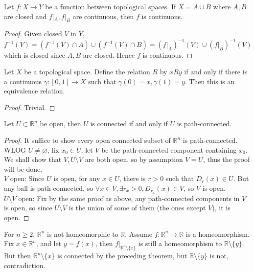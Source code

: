 \begin{lemma}
    Let $f:X\to Y$ be a function between topological spaces.
    If $X=A\cup B$ where $A,B$ are closed and $f|_A,f|_B$ are continuous, then $f$ is continuous.
\end{lemma}
\begin{proof}
    Given closed $V$ in $Y$,
    $$f^{-1}(V)=(f^{-1}(V)\cap A)\cup (f^{-1}(V)\cap B)=(f|_A)^{-1}(V)\cup (f|_B)^{-1}(V)$$
    which is closed since $A,B$ are closed.
    Hence $f$ is continuous.
\end{proof}
\begin{corollary}
    Let $X$ be a topological space.
    Define the relation $R$ by $xRy$ if and only if there is a continuous $\gamma:[0,1]\to X$ such that $\gamma(0)=x,\gamma(1)=y$.
    Then this is an equivalence relation.
\end{corollary}
\begin{proof}
    Trivial.
\end{proof}
\begin{theorem}
    Let $U\subset\mathbb R^n$ be open, then $U$ is connected if and only if $U$ is path-connected.
\end{theorem}
\begin{proof}
    It suffice to show every open connected subset of $\mathbb R^n$ is path-connected.\\
    WLOG $U\neq\varnothing$, fix $x_0\in U$, let $V$ be the path-connected component containing $x_0$.
    We shall show that $V,U\setminus V$ are both open, so by assumption $V=U$, thus the proof will be done.\\
    $V$ open: Since $U$ is open, for any $x\in U$, there is $r>0$ such that $D_r(x)\in U$.
    But any ball is path connected, so $\forall x\in V,\exists r_x>0, D_{r_x}(x)\in V$, so $V$ is open.\\
    $U\setminus V$ open: Fix by the same proof as above, any path-connected components in $V$ is open, so since $U\setminus V$ is the union of some of them (the ones except $V$), it is open.
\end{proof}
\begin{example}
    For $n\ge 2$, $\mathbb R^n$ is not homeomorphic to $\mathbb R$.
    Assume $f:\mathbb R^n\to \mathbb R$ is a homeomorphism.
    Fix $x\in\mathbb R^n$, and let $y=f(x)$, then $f|_{\mathbb R^n\setminus\{x\}}$ is still a homeomorphism to $\mathbb R\setminus\{y\}$.
    But then $\mathbb R^n\setminus\{x\}$ is connected by the preceding theorem, but $\mathbb R\setminus\{y\}$ is not, contradiction.
\end{example}
